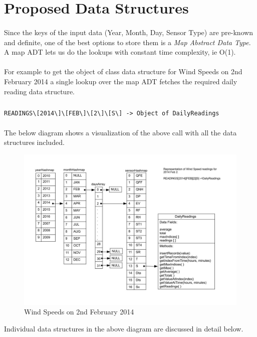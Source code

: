 \documentclass[12pt]{article}
\begin{document}
\section{Proposed Data Structures}
\paragraph{}Since the keys of the input data (Year, Month, Day, Sensor Type) are pre-known and definite, one of the best options to store them is a {\em Map Abstract Data Type}. A map ADT lets us do the lookups with constant time complexity, ie O(1). \cite{TEXTBOOK}
\paragraph{}For example to get the object of class data structure for Wind Speeds on 2nd February 2014 a single lookup over the map ADT fetches the required daily reading data structure.
\subparagraph{}
\begin{lstlisting}
READINGS\[2014\]\[FEB\]\[2\]\[S\] -> Object of DailyReadings
\end{lstlisting}  
\paragraph{}The below diagram shows a visualization of the above call with all the data structures included.
\begin{figure}[H]
	\includegraphics[width=\linewidth]{./data_structure_layout.jpg}
	\caption{Wind Speeds on 2nd February 2014}
	\label{example_datastructure_layout}
\end{figure}
Individual data structures in the above diagram are discussed in detail below.
\end{document}
